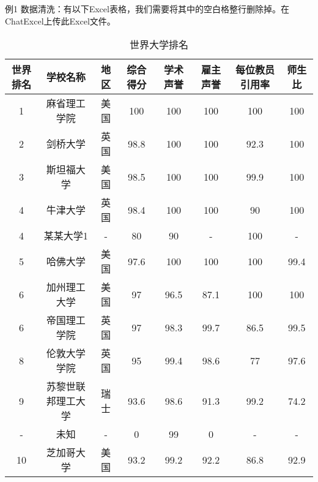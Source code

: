 例1 数据清洗：有以下Excel表格，我们需要将其中的空白格整行删除掉。在ChatExcel上传此Excel文件。
\begin{table}[h]
    \centering
    \begin{tabular}{cccccccc}
        \toprule
        世界排名 & 学校名称 & 地区 & 综合得分 & 学术声誉 & 雇主声誉 & 每位教员引用率 & 师生比 \\
        \midrule
        1  & 麻省理工学院     & 美国 & 100  & 100  & 100  & 100  & 100  \\
        2  & 剑桥大学         & 英国 & 98.8 & 100  & 100  & 92.3 & 100  \\
        3  & 斯坦福大学       & 美国 & 98.5 & 100  & 100  & 99.9 & 100  \\
        4  & 牛津大学         & 英国 & 98.4 & 100  & 100  & 90   & 100  \\
        4  & 某某大学1        & -    & 80   & 90   & -    & 100  & -    \\
        5  & 哈佛大学         & 美国 & 97.6 & 100  & 100  & 100  & 99.4 \\
        6  & 加州理工大学     & 美国 & 97   & 96.5 & 87.1 & 100  & 100  \\
        6  & 帝国理工学院     & 英国 & 97   & 98.3 & 99.7 & 86.5 & 99.5 \\
        8  & 伦敦大学学院     & 英国 & 95   & 99.4 & 98.6 & 77   & 97.6 \\
        9  & 苏黎世联邦理工大学 & 瑞士 & 93.6 & 98.6 & 91.3 & 99.2 & 74.2 \\
        -  & 未知             & -    & 0    & 99   & 0    & -    & -    \\
        10 & 芝加哥大学       & 美国 & 93.2 & 99.2 & 92.2 & 86.8 & 92.9 \\
        \bottomrule
    \end{tabular}
    \caption{世界大学排名}
    \label{tab:world_ranking}
\end{table}
\FloatBarrier






